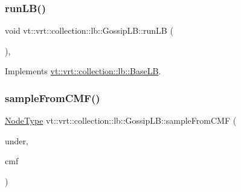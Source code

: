 \mbox{\label{structvt_1_1vrt_1_1collection_1_1lb_1_1_gossip_l_b_a06116496c3146be18c56379775f8715d}} 
\subsubsection{\texorpdfstring{run\+L\+B()}{runLB()}}
{\footnotesize\ttfamily void vt\+::vrt\+::collection\+::lb\+::\+Gossip\+L\+B\+::run\+LB (\begin{DoxyParamCaption}{ }\end{DoxyParamCaption})\hspace{0.3cm}{\ttfamily [override]}, {\ttfamily [virtual]}}



Implements \hyperlink{structvt_1_1vrt_1_1collection_1_1lb_1_1_base_l_b_a69a398c54f8129f365171a1189ffcd84}{vt\+::vrt\+::collection\+::lb\+::\+Base\+LB}.

\mbox{\label{structvt_1_1vrt_1_1collection_1_1lb_1_1_gossip_l_b_a1a9e88510b1b61a181c9b4dcb3a8c153}} 
\subsubsection{\texorpdfstring{sample\+From\+C\+M\+F()}{sampleFromCMF()}}
{\footnotesize\ttfamily \hyperlink{namespacevt_a866da9d0efc19c0a1ce79e9e492f47e2}{Node\+Type} vt\+::vrt\+::collection\+::lb\+::\+Gossip\+L\+B\+::sample\+From\+C\+MF (\begin{DoxyParamCaption}\item[{\hyperlink{structvt_1_1vrt_1_1collection_1_1lb_1_1_gossip_l_b_abb53f1d4bd3c37f3e68c3b5b0e1f1c86}{Node\+Set\+Type} const \&}]{under,  }\item[{std\+::vector$<$ double $>$ const \&}]{cmf }\end{DoxyParamCaption})\hspace{0.3cm}{\ttfamily [protected]}}

